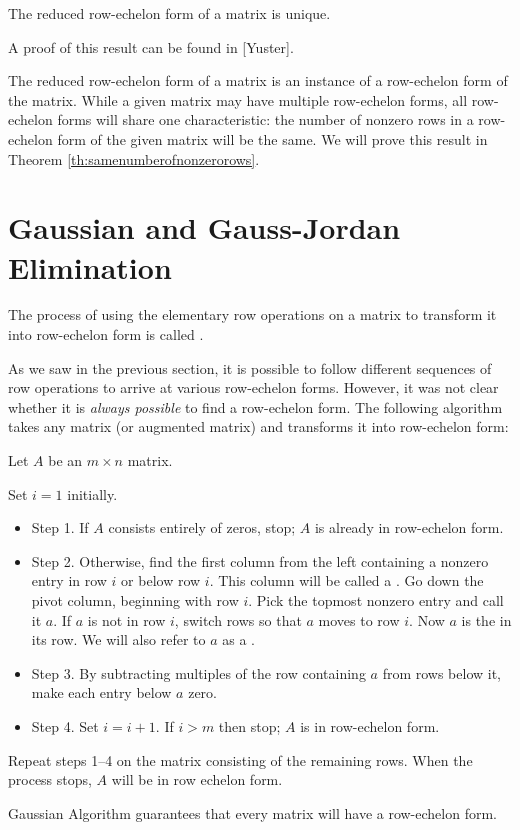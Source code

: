 \documentclass{ximera}
\begin{document}
 
\begin{theorem}\label{th:uniquenessofrref} The reduced row-echelon form of a matrix is unique.
\end{theorem}
A proof of this result can be found in [Yuster].
 
The reduced row-echelon form of a matrix is an instance of a row-echelon form of the matrix.  While a given matrix may have multiple row-echelon forms, all row-echelon forms will share one characteristic: the number of nonzero rows in a row-echelon form of the given matrix will be the same.
We will prove this result in Theorem \ref{th:samenumberofnonzerorows}.
 
\section*{Gaussian and Gauss-Jordan Elimination}
 
\begin{definition}\label{def:GaussianElimination}
The process of using the elementary row operations on a matrix to transform it into row-echelon form is called .
\end{definition}
 
As we saw in the previous section, it is possible to follow different sequences of row operations to arrive at various row-echelon forms.  However, it was not clear whether it is {\it always possible} to find a row-echelon form.  The following algorithm takes any matrix (or augmented matrix) and transforms it into row-echelon form:
\begin{algorithm} \label{alg:gaussian}
Let $A$ be an $m\times n$ matrix.

 
Set $i=1$ initially.
\begin{itemize}
\item[] Step 1. If $A$ consists entirely of zeros, stop;  $A$ is already in row-echelon form.
 
\item[] Step 2. Otherwise, find the first column from the left containing a nonzero entry in row $i$ or below row $i$.  This column will be called a .  Go down the pivot column, beginning with row $i$. Pick the topmost nonzero entry and call it $a$. If $a$ is not in row $i$, switch rows so that $a$ moves to row $i$.  Now $a$ is the  in its row.  We will also refer to $a$ as a . 
 
\item[] Step 3. By subtracting multiples of the row containing $a$ from rows below it, make each entry below $a$ zero.
 
\item[] Step 4.  Set $i=i+1$.  If $i > m$ then stop; $A$ is in row-echelon form.
 
\end{itemize}
 
Repeat steps 1--4 on the matrix consisting of the remaining rows.
When the process stops, $A$ will be in row echelon form.
\end{algorithm}
Gaussian Algorithm guarantees that every matrix will have a row-echelon form. 
\end{document}
